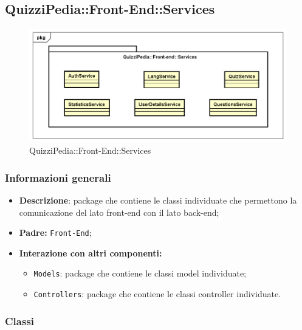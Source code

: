 \newpage
\subsection{QuizziPedia::Front-End::Services}
\begin{figure}[ht]
	\centering
	\includegraphics[scale=0.60]{UML/Package/QuizziPedia_Front-End_Services.png}
	\caption{QuizziPedia::Front-End::Services}
\end{figure} \FloatBarrier
\subsubsection{Informazioni generali}
\begin{itemize}
	\item \textbf{Descrizione}: package che contiene le classi individuate che permettono la comunicazione del lato front-end con il lato back-end;
	\item \textbf{Padre:} \texttt{Front-End};
	\item \textbf{Interazione con altri componenti:}
	\begin{itemize}
		\item \texttt{Models}: package che contiene le classi model individuate;
		\item \texttt{Controllers}: package che contiene le classi controller individuate.
	\end{itemize} 
\end{itemize}
\subsubsection{Classi}

